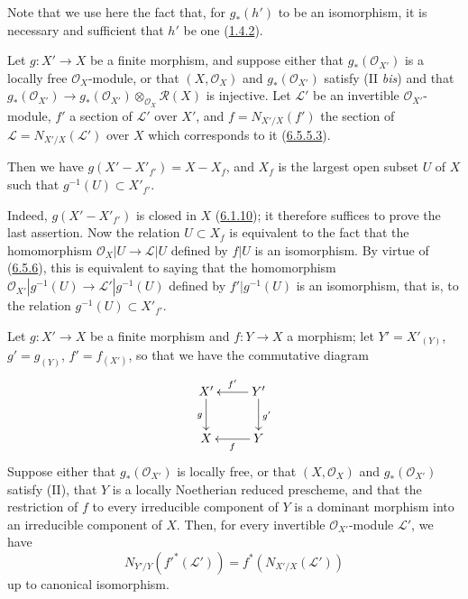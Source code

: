 Note that we use here the fact that, for $g_*(h')$ to be an isomorphism, it
is necessary and sufficient that $h'$ be one
(\hyperref[II.1.4.2]{1.4.2}).

\begin{corollary}[6.5.7]
\label{II.6.5.7}
Let $g:X'\to X$ be a finite morphism, and suppose either that
$g_*(\mathcal{O}_{X'})$ is a locally free $\mathcal{O}_X$-module, or that
$(X,\mathcal{O}_X)$ and $g_*(\mathcal{O}_{X'})$ satisfy (II \emph{bis})
and that
$g_*(\mathcal{O}_{X'})\to
g_*(\mathcal{O}_{X'})\otimes_{\mathcal{O}_X}\mathcal{R}(X)$ is injective.
Let $\mathcal{L}'$ be an invertible $\mathcal{O}_{X'}$-module, $f'$ a
section of $\mathcal{L}'$ over $X'$, and $f=N_{X'/X}(f')$ the section of
$\mathcal{L}=N_{X'/X}(\mathcal{L}')$ over $X$ which corresponds to it
(\hyperref[II.6.5.5.3]{6.5.5.3}).


Then we have $g(X'-X'_{f'})=X-X_f$, and $X_f$ is the largest open subset
$U$ of $X$ such that $g^{-1}(U)\subset X'_{f'}$.
\end{corollary}

Indeed, $g(X'-X'_{f'})$ is closed in $X$
(\hyperref[II.6.1.10]{6.1.10}); it therefore suffices to prove the last
assertion. Now the relation $U\subset X_f$ is equivalent to the fact that the
homomorphism $\mathcal{O}_X|U\to\mathcal{L}|U$ defined by $f|U$ is an
isomorphism. By virtue of (\hyperref[II.6.5.6]{6.5.6}), this is
equivalent to saying that the homomorphism
$\mathcal{O}_{X'}|g^{-1}(U)\to\mathcal{L}'|g^{-1}(U)$ defined by
$f'|g^{-1}(U)$ is an isomorphism, that is, to the relation
$g^{-1}(U)\subset X'_{f'}$.

\begin{proposition}[6.5.8]
\label{II.6.5.8}
Let $g:X'\to X$ be a finite morphism and $f:Y\to X$ a morphism; let
$Y'=X'_{(Y)}$, $g'=g_{(Y)}$, $f'=f_{(X')}$, so that we have the commutative
diagram
\[
\xymatrix{
X'\ar[d]_g & Y'\ar[l]_{f'}\ar[d]^{g'}\\
X & Y\ar[l]^f
}
\]
Suppose either that $g_*(\mathcal{O}_{X'})$ is locally free, or that
$(X,\mathcal{O}_X)$ and $g_*(\mathcal{O}_{X'})$ satisfy (II), that $Y$ is a
locally Noetherian reduced prescheme, and that the restriction of $f$ to
every irreducible component of $Y$ is a dominant morphism into an irreducible
component of $X$. Then, for every invertible $\mathcal{O}_{X'}$-module
$\mathcal{L}'$, we have
\[
N_{Y'/Y}({f'}^*(\mathcal{L}'))=f^*(N_{X'/X}(\mathcal{L}'))
\]
up to canonical isomorphism.
\end{proposition}


